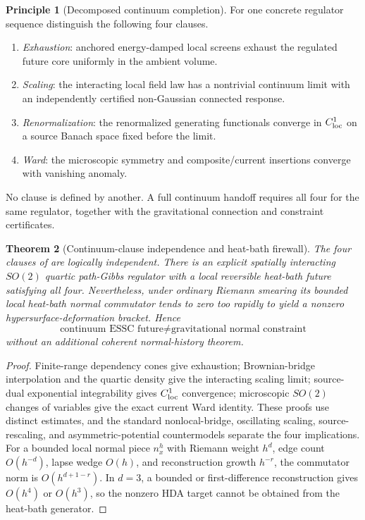 \documentclass[11pt]{article}
\newtheorem{theorem}{Theorem}[section]
\theoremstyle{definition}
\newtheorem{principle}[theorem]{Principle}
\theoremstyle{remark}
\begin{document}
\label{sec:Einstein-extension}

\begin{principle}[Decomposed continuum completion]
\label{prin:ESSC}
For one concrete regulator sequence distinguish the following four clauses.
\begin{enumerate}[label=\textup{(E\arabic*)},leftmargin=3em]
\item \emph{Exhaustion}: anchored energy-damped local screens exhaust the
      regulated future core uniformly in the ambient volume.
\item \emph{Scaling}: the interacting local field law has a nontrivial
      continuum limit with an independently certified non-Gaussian connected
      response.
\item \emph{Renormalization}: the renormalized generating functionals converge
      in $C^1_{\rm loc}$ on a source Banach space fixed before the limit.
\item \emph{Ward}: the microscopic symmetry and composite/current insertions
      converge with vanishing anomaly.
\end{enumerate}
No clause is defined by another.  A full continuum handoff requires all four
for the same regulator, together with the gravitational connection and
constraint certificates.
\end{principle}

\begin{theorem}[Continuum-clause independence and heat-bath firewall]
\label{thm:ESSC-independence-master}
The four clauses of  are logically independent.  There is an
explicit spatially interacting $SO(2)$ quartic path-Gibbs regulator with a
local reversible heat-bath future satisfying all four.  Nevertheless, under
ordinary Riemann smearing its bounded local heat-bath normal commutator tends to
zero too rapidly to yield a nonzero hypersurface-deformation bracket.  Hence
\[
 \boxed{\text{continuum ESSC future}\ne\text{gravitational normal constraint}}
\]
without an additional coherent normal-history theorem.
\end{theorem}

\begin{proof}
Finite-range dependency cones give exhaustion; Brownian-bridge interpolation
and the quartic density give the interacting scaling limit; source-dual
exponential integrability gives $C^1_{\rm loc}$ convergence; microscopic
$SO(2)$ changes of variables give the exact current Ward identity.  These
proofs use distinct estimates, and the standard nonlocal-bridge, oscillating
scaling, source-rescaling, and asymmetric-potential countermodels separate the
four implications.  For a bounded local normal piece $n_x^h$ with Riemann
weight $h^d$, edge count $O(h^{-d})$, lapse wedge $O(h)$, and reconstruction
growth $h^{-r}$, the commutator norm is $O(h^{d+1-r})$.  In $d=3$, a bounded or
first-difference reconstruction gives $O(h^4)$ or $O(h^3)$, so the nonzero HDA
target cannot be obtained from the heat-bath generator.
\end{proof}
\end{document}

